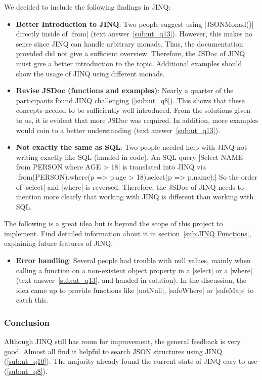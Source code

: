 We decided to include the following findings in JINQ:
\begin{itemize}
  \item \textbf{Better Introduction to JINQ}: Two people suggest using
    |JSONMonad()| directly inside of |from| (text answer~\ref{sub:ut_q13}).
    However, this makes no sense since JINQ can handle arbitrary monads. Thus,
    the documentation provided did not give a sufficient overview.
    Therefore, the JSDoc of JINQ must give a better introduction to the topic.
    Additional examples should show the usage of JINQ using different monads.
  \item \textbf{Revise JSDoc (functions and examples)}: Nearly a quarter of the participants found JINQ
    challenging (\ref{sub:ut_q8}). This shows that these concepts needed to be
    sufficiently well introduced. From the solutions given to us, it is evident
    that more JSDoc was required. In addition, more examples would coin to a
    better understanding (text answer~\ref{sub:ut_q13}).
    \item \textbf{Not exactly the same as SQL}: Two people needed help with
      JINQ not writing exactly like SQL (handed in code). An SQL query
      |Select NAME from PERSON where AGE > 18| is translated into JINQ via
      |from(PERSON).where(p => p.age > 18).select(p => p.name);| So the order
      of |select| and |where| is reversed. Therefore, the JSDoc of JINQ needs to
      mention more clearly that working with JINQ is different than working
      with SQL.
\end{itemize}

The following is a great idea but is beyond the scope of this project to
implement. Find detailed information about it in section~\ref{sub:JINQ
Functions}, explaining future features of JINQ.
\begin{itemize}
  \item \textbf{Error handling}: Several people had trouble with null values,
    mainly when calling a  function on a non-existent object
    property in a |select| or a |where| (text answer~\ref{sub:ut_q13}, and
    handed in solution). In the discussion, the idea came up to
    provide functions like |notNull|, |safeWhere| or |safeMap| to catch this.
\end{itemize}

\subsubsection{Conclusion} %
\label{subsub:usertest_jinq_Conclusion}
Although JINQ still has room for improvement, the general feedback is very
good. Almost all find it helpful to search JSON structures using JINQ
(\ref{sub:ut_q10}). The majority already found the current state of JINQ easy
to use (\ref{sub:ut_q8}).


